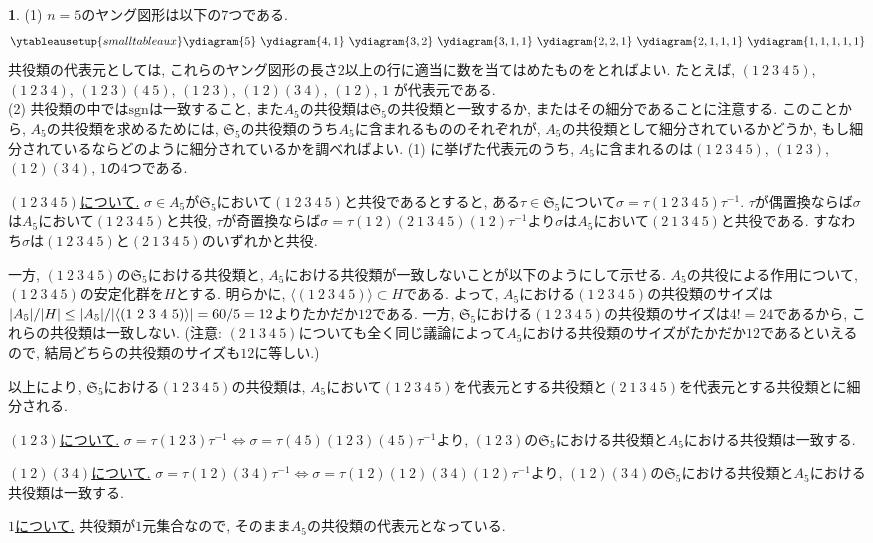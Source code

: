 \documentclass{article}
\theoremstyle{definition}
\newtheorem{ans}{}
\numberwithin{ans}{subsection}
\DeclarePairedDelimiter{\abs}{\lvert}{\rvert}
\begin{document}
\begin{ans}
  (1) $n = 5$のヤング図形は以下の$7$つである.
  \begin{align*}
    \ytableausetup{smalltableaux}
    \ydiagram{5}\ \ydiagram{4, 1}\ \ydiagram{3, 2}\ \ydiagram{3, 1, 1}\ \ydiagram{2, 2, 1}\ \ydiagram{2, 1, 1, 1}\ \ydiagram{1, 1, 1, 1, 1}
  \end{align*}
  共役類の代表元としては, これらのヤング図形の長さ$2$以上の行に適当に数を当てはめたものをとればよい.
  たとえば, $(1\ 2\ 3\ 4\ 5)$, $(1\ 2\ 3\ 4)$, $(1\ 2\ 3)(4\ 5)$, $(1\ 2\ 3)$, $(1\ 2)(3\ 4)$, $(1\ 2)$, $1$
  が代表元である.\\
  (2) 共役類の中では$\mathrm{sgn}$は一致すること,
  また$A_5$の共役類は$\mathfrak{S}_5$の共役類と一致するか, またはその細分であることに注意する.
  このことから, $A_5$の共役類を求めるためには, $\mathfrak{S}_5$の共役類のうち$A_5$に含まれるもののそれぞれが, $A_5$の共役類として細分されているかどうか,
  もし細分されているならどのように細分されているかを調べればよい.
  (1) に挙げた代表元のうち, $A_5$に含まれるのは$(1\ 2\ 3\ 4\ 5)$, $(1\ 2\ 3)$, $(1\ 2)(3\ 4)$, $1$の$4$つである.

  \underline{$(1\ 2\ 3\ 4\ 5)$について.}
  $\sigma \in A_5$が$\mathfrak{S}_5$において$(1\ 2\ 3\ 4\ 5)$と共役であるとすると,
  ある$\tau \in \mathfrak{S}_5$について$\sigma = \tau(1\ 2\ 3\ 4\ 5)\tau^{-1}$.
  $\tau$が偶置換ならば$\sigma$は$A_5$において$(1\ 2\ 3\ 4\ 5)$と共役,
  $\tau$が奇置換ならば$\sigma = \tau(1\ 2)(2\ 1\ 3\ 4\ 5)(1\ 2)\tau^{-1}$より$\sigma$は$A_5$において$(2\ 1\ 3\ 4\ 5)$と共役である.
  すなわち$\sigma$は$(1\ 2\ 3\ 4\ 5)$と$(2\ 1\ 3\ 4\ 5)$のいずれかと共役.

  一方, $(1\ 2\ 3\ 4\ 5)$の$\mathfrak{S}_5$における共役類と, $A_5$における共役類が一致しないことが以下のようにして示せる.
  $A_5$の共役による作用について, $(1\ 2\ 3\ 4\ 5)$の安定化群を$H$とする.
  明らかに, $\langle(1\ 2\ 3\ 4\ 5)\rangle \subset H$である.
  よって, $A_5$における$(1\ 2\ 3\ 4\ 5)$の共役類のサイズは$\abs{A_5}/\abs{H} \le \abs{A_5}/\abs{\langle(1\ 2\ 3\ 4\ 5)\rangle} = 60 / 5 = 12$よりたかだか$12$である.
  一方, $\mathfrak{S}_5$における$(1\ 2\ 3\ 4\ 5)$の共役類のサイズは$4! = 24$であるから,
  これらの共役類は一致しない.
  (注意: $(2\ 1\ 3\ 4\ 5)$についても全く同じ議論によって$A_5$における共役類のサイズがたかだか$12$であるといえるので, 結局どちらの共役類のサイズも$12$に等しい.)

  以上により, $\mathfrak{S}_5$における$(1\ 2\ 3\ 4\ 5)$の共役類は,
  $A_5$において$(1\ 2\ 3\ 4\ 5)$を代表元とする共役類と$(2\ 1\ 3\ 4\ 5)$を代表元とする共役類とに細分される.

  \underline{$(1\ 2\ 3)$について.}
  $\sigma = \tau(1\ 2\ 3)\tau^{-1} \Leftrightarrow \sigma = \tau(4\ 5)(1\ 2\ 3)(4\ 5)\tau^{-1}$より,
  $(1\ 2\ 3)$の$\mathfrak{S}_5$における共役類と$A_5$における共役類は一致する.

  \underline{$(1\ 2)(3\ 4)$について.}
  $\sigma = \tau(1\ 2)(3\ 4)\tau^{-1} \Leftrightarrow \sigma = \tau(1\ 2)(1\ 2)(3\ 4)(1\ 2)\tau^{-1}$より,
  $(1\ 2)(3\ 4)$の$\mathfrak{S}_5$における共役類と$A_5$における共役類は一致する.

  \underline{$1$について.} 共役類が$1$元集合なので, そのまま$A_5$の共役類の代表元となっている.\\
\end{ans}
\end{document}
